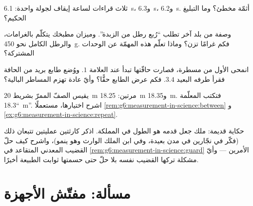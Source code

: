 \begin{exercise}[$\star$]\label{exo:g6:measurement-in-science:8}
ثلاث قراءات لساعة إيقاف لجولة واحدة: \qty{6.1}{s}، و\qty{6.3}{s}،
و\qty{6.2}{s}. أثمّة مخطئ؟ وما التبليغ الحكيم؟
\end{exercise}

\begin{exercise}[$\star\star$]\label{exo:g6:measurement-in-science:9}
وصفة من بلد آخر تطلب ``رُبع رطل من الزبدة''. وميزان مطبخك يتكلّم
بالغرامات، والرطل الكامل نحو \qty{450}{g}. فكم غرامًا تزن؟ وماذا
تعلّم هذه المهمّة عن الوحدات المشتركة؟
\end{exercise}

\begin{exercise}[$\star\star$]\label{exo:g6:measurement-in-science:10}
انمحى  الأول من مسطرة، فصارت حافّتها تبدأ عند العلامة
$1$. ووُضع طابع بريد من الحافة فقرأ طرفه البعيد $3.4$. فكم عرض
الطابع حقًّا؟ وأيّ عادة تهزم المساطر البالية؟
\end{exercise}

\begin{exercise}[$\star\star$]\label{exo:g6:measurement-in-science:11}
يقيس الصفّ الممرّ بشريط \qty{20}{m} مرتين: \qty{18.25}{m}
و\qty{18.35}{m}. فتكتب المعلّمة ``\qty{18.3}{m}''. اشرح
اختيارها، مستعملًا
\cref{rem:g6:measurement-in-science:between} و
\cref{ex:g6:measurement-in-science:repeat}.
\end{exercise}

\begin{exercise}[$\star\star\star$]\label{exo:g6:measurement-in-science:12}
حكاية قديمة: ملك جعل قدمه هو  الطول في المملكة. اذكر
كارثتين عمليتين تتبعان ذلك (فكّر في نجّارين في مدن بعيدة، وفي
ابن الملك الوارث وهو ينمو)، واشرح كيف حلّ القضيب المعدني
المتقاعد في \cref{rem:g6:measurement-in-science:guard} الأمرين
--- وأيّ مشكلة تركها القضيب نفسه بلا حلّ حتى حسمتها ثوابت
الطبيعة أخيرًا.
\end{exercise}

\section{مسألة: مفتّش الأجهزة}

